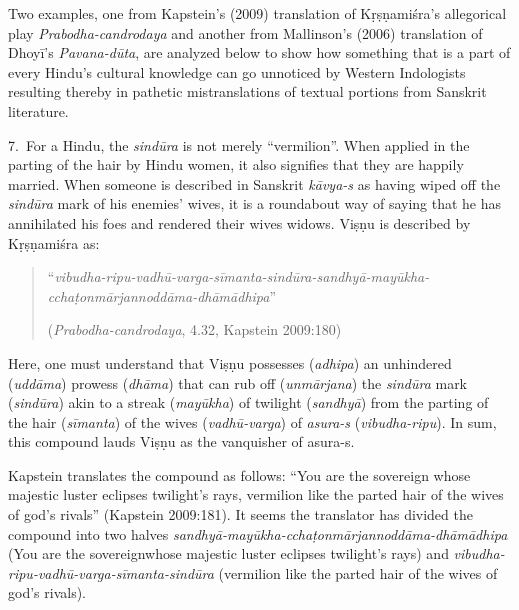 Two examples, one from Kapstein’s (2009) translation of Kṛṣṇamiśra’s allegorical play \textsl{Prabodha-candrodaya} and another from Mallinson’s (2006) translation of Dhoyī’s \textsl{Pavana-dūta}, are analyzed below to show how something that is a part of every Hindu’s cultural knowledge can go unnoticed by Western Indologists resulting thereby in pathetic mistranslations of textual portions from Sanskrit literature. 

7.~For a Hindu, the \textsl{sindūra} is not merely “vermilion”. When applied in the parting of the hair by Hindu women, it also signifies that they are happily married. When someone is described in Sanskrit \textsl{kāvya-s} as having wiped off the \textsl{sindūra} mark of his enemies’ wives, it is a roundabout way of saying that he has annihilated his foes and rendered their wives widows. Viṣṇu is described by Kṛṣṇamiśra as: 
\begin{quote}
“\textsl{vibudha-ripu-vadhū-varga-sīmanta-sindūra-sandhyā-mayūkha-cchaṭonmārjannoddāma-dhāmādhipa}” 

\hfill(\textsl{Prabodha-candrodaya}, 4.32, Kapstein 2009:180)
\end{quote}

Here, one must understand that Viṣṇu possesses (\textsl{adhipa}) an unhindered (\textsl{uddāma}) prowess (\textsl{dhāma}) that can rub off (\textsl{unmārjana}) the \textsl{sindūra} mark (\textsl{sindūra}) akin to a streak (\textsl{mayūkha}) of twilight (\textsl{sandhyā}) from the parting of the hair (\textsl{sīmanta}) of the wives (\textsl{vadhū-varga}) of \textsl{asura-s} (\textsl{vibudha-ripu}). In sum, this compound lauds Viṣṇu as the vanquisher of asura-s. 

Kapstein translates the compound as follows: “You are the sovereign whose majestic luster eclipses twilight’s rays, vermilion like the parted hair of the wives of god’s rivals” (Kapstein 2009:181). It seems the translator has divided the compound into two halves \textsl{sandhyā-mayūkha-cchaṭonmārjannoddāma-dhāmādhipa} (You are the sovereign\break whose majestic luster eclipses twilight’s rays) and \textsl{vibudha-ripu-vadhū-varga-sīmanta-sindūra} (vermilion like the parted hair of the wives of god’s rivals). 

